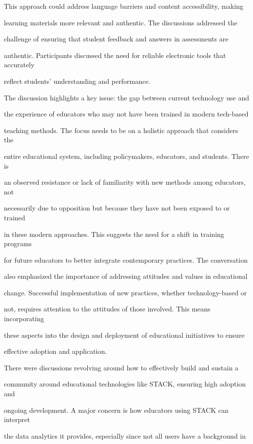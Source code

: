 \documentclass[11pt]{article}
\begin{document}
This approach could address language barriers and content accessibility, making

learning materials more relevant and authentic. The discussions addressed the

challenge of ensuring that student feedback and answers in assessments are

authentic. Participants discussed the need for reliable electronic tools that accurately

reflect students' understanding and performance.

The discussion highlights a key issue: the gap between current technology use and

the experience of educators who may not have been trained in modern tech-based

teaching methods. The focus needs to be on a holistic approach that considers the

entire educational system, including policymakers, educators, and students. There is

an observed resistance or lack of familiarity with new methods among educators, not

necessarily due to opposition but because they have not been exposed to or trained

in these modern approaches. This suggests the need for a shift in training programs

for future educators to better integrate contemporary practices. The conversation

also emphasized the importance of addressing attitudes and values in educational

change. Successful implementation of new practices, whether technology-based or

not, requires attention to the attitudes of those involved. This means incorporating

these aspects into the design and deployment of educational initiatives to ensure

effective adoption and application.

There were discussions revolving around how to effectively build and sustain a

community around educational technologies like STACK, ensuring high adoption and

ongoing development. A major concern is how educators using STACK can interpret

the data analytics it provides, especially since not all users have a background in
\end{document}
